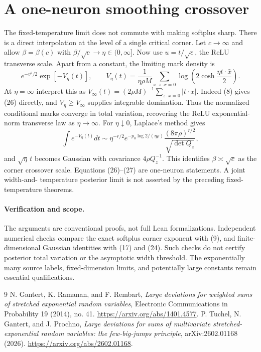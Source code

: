 \documentclass[11pt]{article}
\begin{document}
\section{A one-neuron smoothing crossover}
The fixed-temperature limit does not commute with making softplus sharp.
There is a direct interpolation at the level of a single critical corner.
Let $c\to\infty$ and allow $\beta=\beta(c)$ with
$\beta/\sqrt c\to\eta\in(0,\infty]$. Now use $u=t/\sqrt c$, the
ReLU transverse scale. Apart from a constant, the limiting mark density is
\[
 e^{-v^2/2}\exp[-V_\eta(t)],\qquad
 V_\eta(t)=\frac1{\eta\rho M}\sum_{x:z\cdot x=0}
                  \log\left(2\cosh\frac{\eta t\cdot\bar x}{2}\right).
 \tag{26}
\]
At $\eta=\infty$ interpret this as
$V_\infty(t)=(2\rho M)^{-1}\sum_{z\cdot x=0}|t\cdot\bar x|$.
Indeed (8) gives (26) directly, and
$V_\eta\ge V_\infty$ supplies integrable domination. Thus the normalized
conditional marks converge in total variation, recovering the ReLU
exponential-norm transverse law as $\eta\to\infty$.
For $\eta\downarrow0$, Laplace's method gives
\[
 \int e^{-V_\eta(t)}dt
 \sim \eta^{-r/2}e^{-p_0\log2/(\eta\rho)}
                         \frac{(8\pi\rho)^{r/2}}{\sqrt{\det Q_z}},
 \tag{27}
\]
and $\sqrt\eta\,t$ becomes Gaussian with covariance $4\rho Q_z^{-1}$.
This identifies $\beta\asymp\sqrt c$ as the corner crossover scale.
Equations (26)--(27) are one-neuron statements. A joint width-and-
temperature posterior limit is not asserted by the preceding fixed-
temperature theorems.

\paragraph{Verification and scope.}
The arguments are conventional proofs, not full Lean formalizations.
Independent numerical checks compare the exact softplus corner exponent
with (9), and finite-dimensional Gaussian identities with (17) and (24).
Such checks do not certify posterior total variation or the asymptotic
width threshold. The exponentially many source labels, fixed-dimension
limits, and potentially large constants remain essential qualifications.

\begin{thebibliography}{9}
 N. Gantert, K. Ramanan, and F. Rembart,
\emph{Large deviations for weighted sums of stretched exponential random
variables}, Electronic Communications in Probability 19 (2014), no. 41.
\url{https://arxiv.org/abs/1401.4577}.
 P. Tuchel, N. Gantert, and J. Prochno,
\emph{Large deviations for sums of multivariate stretched-exponential
random variables: the few-big-jumps principle}, arXiv:2602.01168 (2026).
\url{https://arxiv.org/abs/2602.01168}.
\end{thebibliography}
\end{document}
